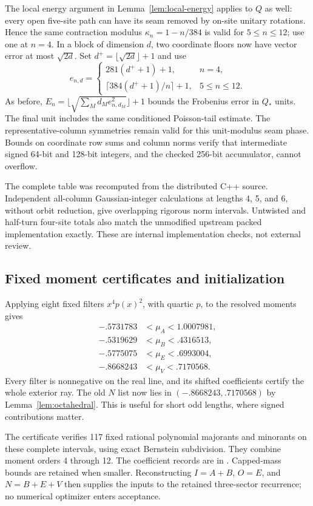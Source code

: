The local energy argument in Lemma~\ref{lem:local-energy} applies to
$Q$ as well: every open five-site path can have its seam removed by
on-site unitary rotations. Hence the same contraction modulus
$\kappa_n=1-n/384$ is valid for $5\le n\le12$; use one at $n=4$.
In a block of dimension $d$, two coordinate floors now have vector
error at most $\sqrt{2d}$. Set $d^+=\lfloor\sqrt{2d}\rfloor+1$ and use
\[
 e_{n,d}=\begin{cases}
 281(d^++1)+1,&n=4,\\
 \lceil384(d^++1)/n\rceil+1,&5\le n\le12.
 \end{cases}
\]
As before, $E_n=\lfloor\sqrt{\sum_M d_Me_{n,d_M}^2}\rfloor+1$
bounds the Frobenius error in $Q_*$ units. The final unit includes the
same conditioned Poisson-tail estimate. The representative-column
symmetries remain valid for this unit-modulus seam phase. Bounds on
coordinate row sums and column norms verify that intermediate signed
64-bit and 128-bit integers, and the checked 256-bit accumulator,
cannot overflow.

The complete table was recomputed from the distributed C++ source.
Independent all-column Gaussian-integer calculations at lengths
4, 5, and 6, without orbit reduction, give overlapping rigorous norm
intervals. Untwisted and half-turn four-site totals also match the
unmodified upstream packed implementation exactly. These are internal
implementation checks, not external review.

\subsection{Fixed moment certificates and initialization}
Applying eight fixed filters $x^4p(x)^2$, with quartic $p$,
to the resolved moments gives
\begin{align*}
 -.5731783&<\mu_A<1.0007981,\\
 -.5319629&<\mu_B<.4316513,\\
 -.5775075&<\mu_E<.6993004,\\
 -.8668243&<\mu_V<.7170568.
\end{align*}
Every filter is nonnegative on the real line, and its shifted
coefficients certify the whole exterior ray. The old $N$ list now lies
in $(-.8668243,.7170568)$ by Lemma~\ref{lem:octahedral}.
This is useful for short odd lengths, where signed contributions matter.

The certificate verifies 117 fixed rational polynomial majorants and
minorants on these complete intervals, using exact Bernstein subdivision.
They combine moment orders 4 through 12. The coefficient records are in
.
Capped-mass bounds are retained when smaller. Reconstructing
$I=A+B$, $O=E$, and $N=B+E+V$ then supplies the inputs to the retained
three-sector recurrence; no numerical optimizer enters acceptance.

